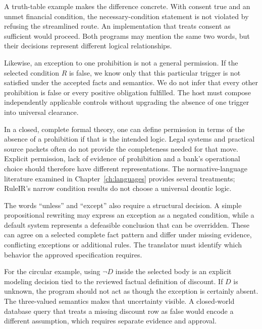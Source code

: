 A truth-table example makes the difference concrete. With consent true and an
unmet financial condition, the necessary-condition statement is not violated by
refusing the streamlined route. An implementation that treats consent as sufficient
would proceed. Both programs may mention the same two words, but their decisions
represent different logical relationships.

Likewise, an exception to one prohibition is not a general permission. If the
selected condition $R$ is false, we know only that this particular trigger is not
satisfied under the accepted facts and semantics. We do not infer that every
other prohibition is false or every positive obligation fulfilled. The host must
compose independently applicable controls without upgrading the absence of one
trigger into universal clearance.


In a closed, complete formal theory, one can define permission in terms of the
absence of a prohibition if that is the intended logic. Legal systems and practical
source packets often do not provide the completeness needed for that move.
Explicit permission, lack of evidence of prohibition and a bank's operational
choice should therefore have different representations. The normative-language
literature examined in Chapter~\ref{ch:languages} provides several treatments;
RuleIR's narrow condition results do not choose a universal deontic logic.

The words ``unless'' and ``except'' also require a structural decision. A simple
propositional rewriting may express an exception as a negated condition, while a
default system represents a defeasible conclusion that can be overridden. These
can agree on a selected complete fact pattern and differ under missing evidence,
conflicting exceptions or additional rules. The translator must identify which
behavior the approved specification requires.

For the circular example, using $\neg D$ inside the selected body is an explicit
modeling decision tied to the reviewed factual definition of discount. If $D$ is
unknown, the program should not act as though the exception is certainly absent.
The three-valued semantics makes that uncertainty visible. A closed-world database
query that treats a missing discount row as false would encode a different
assumption, which requires separate evidence and approval.

